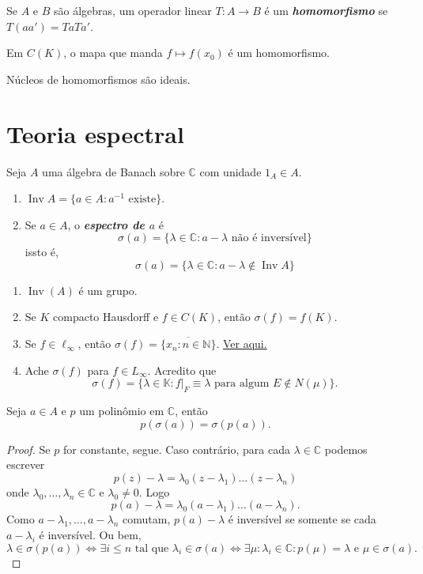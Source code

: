 \documentclass[portuguese]{article}
\theoremstyle{definition}
\newcommand{\N}{\mathbb{N}}
\newcommand{\C}{\mathbb{C}}
\begin{document}
\begin{defn}
	Se $A$ e $B$ são álgebras, um operador linear $T:A\to B$ é um \textbf{\textit{homomorfismo}} se $T(aa')=TaTa'$.
\end{defn}
\begin{exemplo}
	Em $C(K)$, o mapa que manda $f\mapsto f(x_0)$ é um homomorfismo.
\end{exemplo}
\begin{obs}
	Núcleos de homomorfismos são ideais.
\end{obs}
\section{Teoria espectral}
\begin{defn}
	Seja $A$ uma álgebra de Banach sobre $\C$ com unidade $1_A\in A$.
	\begin{enumerate}
		\item $\operatorname{Inv}A=\{a\in A:a^{-1}\text{ existe}\}$.
		\item Se $a\in A$, o \textbf{\textit{espectro de $a$}} é
		\[\sigma(a)=\{\lambda\in\C:a-\lambda\text{ não é inversível}\}\]
		issto é,
		\[\sigma(a)=\{\lambda\in\C:a-\lambda\notin\operatorname{Inv}A\}\]
	\end{enumerate}
\end{defn}
\begin{exemplos}\leavevmode
	\begin{enumerate}
		\item $\operatorname{Inv}(A)$ é um grupo.
		\item Se $K$ compacto Hausdorff e $f\in C(K)$, então $\sigma (f)=f(K)$.
		\item Se $f\in\ell_\infty$, então $\sigma(f)=\overline{\{x_n:n\in\N\}}$. \href{https://math.stackexchange.com/questions/3077283/finding-the-spectrum-of-an-element-of-ell-infty}{Ver aqui.}
		\item {\color{orange} Ache $\sigma (f)$ para $f\in L_\infty$.} {\color{persiangreen}Acredito que \[\sigma(f)=\{\lambda\in\mathbb{K}:f|_F\equiv \lambda\text{ para algum }E\notin N(\mu)\}.\]}
	\end{enumerate}
\end{exemplos}
\begin{prop}
	Seja $a\in A$ e $p$ um polinômio em $\C$, então
	\[p(\sigma(a))=\sigma(p(a)).\]
\end{prop}
\begin{proof}
	Se $p$ for constante, segue. Caso contrário, para cada $\lambda\in\C$ podemos escrever
	\[p(z)-\lambda=\lambda_0(z-\lambda_1)\ldots(z-\lambda_n)\]
	onde $\lambda_0,\ldots,\lambda_n\in\C$ e $\lambda_0\neq0$.
	Logo
	\[p(a)-\lambda=\lambda_0(a-\lambda_1)\ldots(a-\lambda_n).\]
	Como $a-\lambda_1,\ldots,a-\lambda_n$ comutam, $p(a)-\lambda$ é inversível se somente se cada $a-\lambda_i$ é inversível. Ou bem,
	\[\lambda\in\sigma(p(a))\iff\exists i\leq n\text{ tal que } \lambda_i\in\sigma(a)\iff\exists\mu:\lambda_i\in\C:p(\mu)=\lambda\text{ e }\mu\in\sigma(a).\]
\end{proof}
\end{document}
